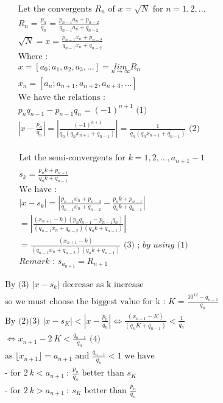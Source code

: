 \documentclass[10pt,a4paper]{letter}
\begin{document}
\begin{align*}	
	&\text{Let the convergents  } \textit{R}_{n} \text{ of } x=\sqrt{N} \text{ for } n=1,2,...\\
  & \textit{R}_{n} =\frac{p_{n}}{q_{n}} = \frac{p_{n-1}a_{n}+p_{n-2}}{q_{n-1}a_{n}+q_{n-2}} \\
  &\sqrt{N}=x=\frac{p_{n-1}x_{n}+p_{n-2}}{q_{n-1}x_{n}+q_{n-2}}\\
	& \text{Where :}\\
	& x=[a_{0};a_{1},a_{2},a_{3},...]=\underset{n\rightarrow\infty}{lim}  {R}_{n}\\
	& x_{n}=[a_{n};a_{n+1},a_{n+2},a_{n+3},...]\\
	& \text{We have the relations :}\\
	&  p_{n}q_{n-1}-p_{n-1}q_{n}=(-1)^{n+1} \text{ (1) } \\
	& \left| x-\frac{p_{n}}{q_{n}} \right| = \left| \frac{(-1)^{n+1}}{q_{n}(q_{n}x_{n+1}+q_{n-1})}  \right| 
	=\frac{1}{q_{n}(q_{n}x_{n+1}+q_{n-1})} \text{ (2) } \\				
\end{align*}


\begin{align*}
& \text{Let the semi-convergents for } k=1,2,...,a_{n+1}-1\\
& s_{k}=\frac{p_{n}k+p_{n-1}}{q_{n}k+q_{n-1}}\\
& \text{We have :}\\ 
& \left| x-s_{k}\right|=\left|\frac{p_{n-1}x_{n}+p_{n-2}}{q_{n-1}x_{n}+q_{n-2}}
 - \frac{p_{n}k+p_{n-1}}{q_{n}k+q_{n-1}} \right|\\
&=\left|\frac{(x_{n+1}-k)(p_{n}q_{n-1}-p_{n-1}q_{n})}{(q_{n-1}x_{n}+q_{n-2})(q_{n}k+q_{n-1})}\right|\\
&=\frac{(x_{n+1}-k)}{(q_{n-1}x_{n}+q_{n-2})(q_{n}k+q_{n-1})} \text{ (3)  ;} \textit {  by using (1)}\\
& \textit{Remark : } s_{a_{n+1}}=R_{n+1}
\end{align*}

\begin{align*}
& \text {By (3) }\left| x-s_{k}\right| \text{ decrease  as k increase}\\
& \text{so we must choose the biggest value for k : } K=\frac{10^{12}-q_{n-1}}{q_{n}}\\
&  \text {By (2)(3) } \left| x-s_{K}\right| < \left| x-\frac{p_{n}}{q_{n}} \right| \Leftrightarrow \frac{(x_{n+1}-K)}{(q_{n}K+q_{n-1})} < \frac{1}{q_{n}}\\
& \Leftrightarrow x_{n+1}-2\  K < \frac{q_{n-1}}{q_{n}}\text { (4)}\\
& \text{as } \lfloor x_{n+1} \rfloor = a_{n+1} \text{ and } \frac{q_{n-1}}{q_{n}}<1 \text{ we have }\\
& \text {- for } 2\ k < a_{n+1}\ :\  \frac{p_{n}}{q_{n}} \text{ better than } s_{K} \\
&\text {- for } 2\ k > a_{n+1}\ :\  s_{K} \text{ better than }\frac{p_{n}}{q_{n}}  \\
\end{align*}
\end{document}
